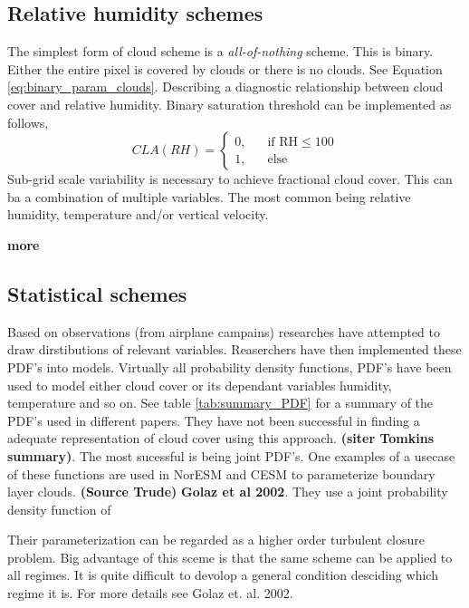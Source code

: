 \subsection{Relative humidity schemes}
The simplest form of cloud scheme is a \textit{all-of-nothing} scheme. This is binary. Either the entire pixel is covered by clouds or there is no clouds. See Equation \ref{eq:binary_param_clouds}. Describing a diagnostic relationship between cloud cover and relative humidity. Binary saturation threshold can be implemented as follows,
\begin{equation} \label{eq:binary_param_clouds}
    CLA\left(RH\right) = 
     \begin{cases}
       \text{0,} &\quad\text{if RH}\le100\\
       \text{1,} &\quad\text{else}
     \end{cases}
\end{equation}
Sub-grid scale variability is necessary to achieve fractional cloud cover. This can ba a combination of multiple variables. The most common being relative humidity, temperature and/or vertical velocity. 

\textbf{more}

\subsection{Statistical schemes}
Based on observations (from airplane campains) researches have attempted to draw dirstibutions of relevant variables. Reaserchers have then implemented these PDF's into models. Virtually all probability density functions, PDF's have been used to model either cloud cover or its dependant variables humidity, temperature and so on. See table \ref{tab:summary_PDF} for a summary of the PDF's used in different papers. They have not been successful in finding a adequate representation of cloud cover using this approach. \textbf{(siter Tomkins summary)}. The most sucessful is being joint PDF's. One examples of a usecase of these functions are used in NorESM and CESM to parameterize boundary layer clouds. \textbf{(Source Trude)} \textbf{Golaz et al 2002}. They use a joint probability density function of 

Their parameterization can be regarded as a higher order turbulent closure problem. Big advantage of this sceme is that the same scheme can be applied to all regimes. It is quite difficult to devolop a general condition desciding which regime it is.  
For more details see Golaz et. al. 2002.

